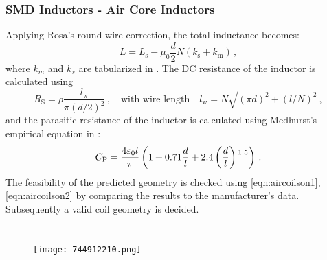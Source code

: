 \begin{frame}
	\frametitle{SMD Inductors - Air Core Inductors} 
	Applying Rosa's round wire correction, the total inductance becomes:
	\begin{equation}
		L = L_\mathrm{s} - \mu_0\frac{d}{2}N(k_\mathrm{s}+k_\mathrm{m})\,,
	\end{equation}
	where $k_m$ and $k_s$ are tabularized in \cite{rosa}. The DC resistance of the inductor is calculated using
	\begin{equation}  \label{eqn:aircoilson1}
		R_\mathrm{S} = \rho\frac{l_\mathrm{w}}{\pi (d/2)^2}\,,
		\quad \text{with wire length} \quad 
		l_\mathrm{w} = N\sqrt{(\pi d)^2+(l/N)^2}\,,
	\end{equation}
	and the parasitic resistance of the inductor is calculated using Medhurst's empirical equation in \cite{medhurst}: 
	\begin{equation} \label{eqn:aircoilson2}
		C_\mathrm{P} = \frac{4\varepsilon_0l}{\pi}\left(1+0.71\frac{d}{l}+2.4\left(\frac{d}{l}\right)\strut^{1.5}\right)\,.
	\end{equation}
	The feasibility of the predicted geometry is checked using \eqref{eqn:aircoilson1}, \eqref{eqn:aircoilson2} by comparing the results to the manufacturer's data. Subsequently a valid coil geometry is decided.
	\begin{columns}
		\centering
		\begin{figure}
			\texttt{[image: 744912210.png]}
		\end{figure}
		\vspace{4em}
	\end{columns}
\end{frame}

